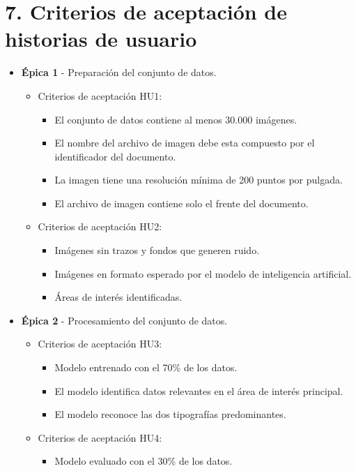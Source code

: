 \documentclass[
11pt, %
]{charter}
\begin{document}
\section{7. Criterios de aceptación de historias de usuario}
\label{sec:criteriosAceptacion}

\begin{itemize}
  \item \textbf{\'{E}pica 1} - Preparación del conjunto de datos.
    \begin{itemize}
      \item Criterios de aceptación HU1:
	    \begin{itemize}
			\item El conjunto de datos contiene al menos 30.000 imágenes.
			\item El nombre del archivo de imagen debe esta compuesto por el identificador del documento.
			\item La imagen tiene una resolución mínima de 200 puntos por pulgada.
			\item El archivo de imagen contiene solo el frente del documento.
	    \end{itemize}
      \item Criterios de aceptación HU2:
	    \begin{itemize}
			\item Imágenes sin trazos y fondos que generen ruido.
			\item Imágenes en formato esperado por el modelo de inteligencia artificial.
			\item Áreas de interés identificadas.
	    \end{itemize}
    \end{itemize}
  \item \textbf{\'{E}pica 2} - Procesamiento del conjunto de datos.
    \begin{itemize}
      \item Criterios de aceptación HU3:
	    \begin{itemize}
			\item Modelo entrenado con el 70\% de los datos.
			\item El modelo identifica datos relevantes en el área de interés principal.
			\item El modelo reconoce las dos tipografías predominantes.
	    \end{itemize}
      \item Criterios de aceptación HU4:
	    \begin{itemize}
			\item Modelo evaluado con el 30\% de los datos.

\end{itemize}
\end{itemize}
\end{itemize}
\end{document}
